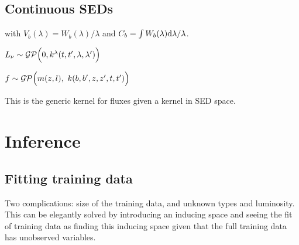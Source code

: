 \documentclass[aps,prd,showpacs,superscriptaddress,groupedaddress]{revtex4}  %
\begin{document}
\subsection{Continuous SEDs}



with $V_b(\lambda) = W_b(\lambda)/\lambda$ and $C_b = \int W_b(\lambda) \mathrm{d}\lambda / \lambda$.

$L_\nu \sim \mathcal{GP}\Bigl(0, k^\lambda(t,t',\lambda,\lambda') \Bigr)$

$f  \sim \mathcal{GP}\Bigl( m(z,l), \ k(b,b',z,z',t,t') \Bigr)$



This is the generic kernel for fluxes given a kernel in SED space.



\section{Inference}

\subsection{Fitting training data}


Two complications: size of the training data, and unknown types and luminosity. 
This can be elegantly solved by introducing an inducing space and seeing the fit of training data as finding this inducing space given that the full training data has unobserved variables.
\end{document}
